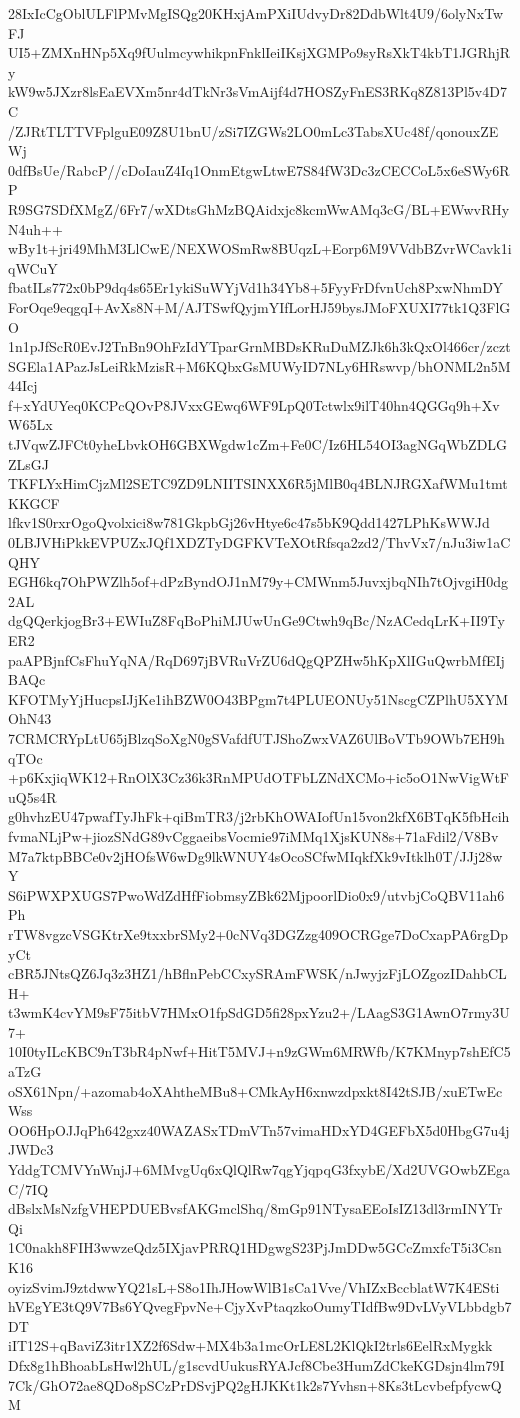 28IxIcCgOblULFlPMvMgISQg20KHxjAmPXiIUdvyDr82DdbWlt4U9/6olyNxTwFJ
UI5+ZMXnHNp5Xq9fUulmcywhikpnFnklIeiIKsjXGMPo9syRsXkT4kbT1JGRhjRy
kW9w5JXzr8lsEaEVXm5nr4dTkNr3sVmAijf4d7HOSZyFnES3RKq8Z813Pl5v4D7C
/ZJRtTLTTVFplguE09Z8U1bnU/zSi7IZGWs2LO0mLc3TabsXUc48f/qonouxZEWj
0dfBsUe/RabcP//cDoIauZ4Iq1OnmEtgwLtwE7S84fW3Dc3zCECCoL5x6eSWy6RP
R9SG7SDfXMgZ/6Fr7/wXDtsGhMzBQAidxjc8kcmWwAMq3cG/BL+EWwvRHyN4uh++
wBy1t+jri49MhM3LlCwE/NEXWOSmRw8BUqzL+Eorp6M9VVdbBZvrWCavk1iqWCuY
fbatILs772x0bP9dq4s65Er1ykiSuWYjVd1h34Yb8+5FyyFrDfvnUch8PxwNhmDY
ForOqe9eqgqI+AvXs8N+M/AJTSwfQyjmYIfLorHJ59bysJMoFXUXI77tk1Q3FlGO
1n1pJfScR0EvJ2TnBn9OhFzIdYTparGrnMBDsKRuDuMZJk6h3kQxOl466cr/zczt
SGEla1APazJsLeiRkMzisR+M6KQbxGsMUWyID7NLy6HRswvp/bhONML2n5M44Icj
f+xYdUYeq0KCPcQOvP8JVxxGEwq6WF9LpQ0Tctwlx9ilT40hn4QGGq9h+XvW65Lx
tJVqwZJFCt0yheLbvkOH6GBXWgdw1cZm+Fe0C/Iz6HL54OI3agNGqWbZDLGZLsGJ
TKFLYxHimCjzMl2SETC9ZD9LNIITSINXX6R5jMlB0q4BLNJRGXafWMu1tmtKKGCF
lfkv1S0rxrOgoQvolxici8w781GkpbGj26vHtye6c47s5bK9Qdd1427LPhKsWWJd
0LBJVHiPkkEVPUZxJQf1XDZTyDGFKVTeXOtRfsqa2zd2/ThvVx7/nJu3iw1aCQHY
EGH6kq7OhPWZlh5of+dPzByndOJ1nM79y+CMWnm5JuvxjbqNIh7tOjvgiH0dg2AL
dgQQerkjogBr3+EWIuZ8FqBoPhiMJUwUnGe9Ctwh9qBc/NzACedqLrK+II9TyER2
paAPBjnfCsFhuYqNA/RqD697jBVRuVrZU6dQgQPZHw5hKpXlIGuQwrbMfEIjBAQc
KFOTMyYjHucpsIJjKe1ihBZW0O43BPgm7t4PLUEONUy51NscgCZPlhU5XYMOhN43
7CRMCRYpLtU65jBlzqSoXgN0gSVafdfUTJShoZwxVAZ6UlBoVTb9OWb7EH9hqTOc
+p6KxjiqWK12+RnOlX3Cz36k3RnMPUdOTFbLZNdXCMo+ic5oO1NwVigWtFuQ5s4R
g0hvhzEU47pwafTyJhFk+qiBmTR3/j2rbKhOWAIofUn15von2kfX6BTqK5fbHcih
fvmaNLjPw+jiozSNdG89vCggaeibsVocmie97iMMq1XjsKUN8s+71aFdil2/V8Bv
M7a7ktpBBCe0v2jHOfsW6wDg9lkWNUY4sOcoSCfwMIqkfXk9vItklh0T/JJj28wY
S6iPWXPXUGS7PwoWdZdHfFiobmsyZBk62MjpoorlDio0x9/utvbjCoQBV11ah6Ph
rTW8vgzcVSGKtrXe9txxbrSMy2+0cNVq3DGZzg409OCRGge7DoCxapPA6rgDpyCt
cBR5JNtsQZ6Jq3z3HZ1/hBflnPebCCxySRAmFWSK/nJwyjzFjLOZgozIDahbCLH+
t3wmK4cvYM9sF75itbV7HMxO1fpSdGD5fi28pxYzu2+/LAagS3G1AwnO7rmy3U7+
10I0tyILcKBC9nT3bR4pNwf+HitT5MVJ+n9zGWm6MRWfb/K7KMnyp7shEfC5aTzG
oSX61Npn/+azomab4oXAhtheMBu8+CMkAyH6xnwzdpxkt8I42tSJB/xuETwEcWss
OO6HpOJJqPh642gxz40WAZASxTDmVTn57vimaHDxYD4GEFbX5d0HbgG7u4jJWDc3
YddgTCMVYnWnjJ+6MMvgUq6xQlQlRw7qgYjqpqG3fxybE/Xd2UVGOwbZEgaC/7IQ
dBslxMsNzfgVHEPDUEBvsfAKGmclShq/8mGp91NTysaEEoIsIZ13dl3rmINYTrQi
1C0nakh8FIH3wwzeQdz5IXjavPRRQ1HDgwgS23PjJmDDw5GCcZmxfcT5i3CsnK16
oyizSvimJ9ztdwwYQ21sL+S8o1IhJHowWlB1sCa1Vve/VhIZxBccblatW7K4ESti
hVEgYE3tQ9V7Bs6YQvegFpvNe+CjyXvPtaqzkoOumyTIdfBw9DvLVyVLbbdgb7DT
iIT12S+qBaviZ3itr1XZ2f6Sdw+MX4b3a1mcOrLE8L2KlQkI2trls6EelRxMygkk
Dfx8g1hBhoabLsHwl2hUL/g1scvdUukusRYAJcf8Cbe3HumZdCkeKGDsjn4lm79I
7Ck/GhO72ae8QDo8pSCzPrDSvjPQ2gHJKKt1k2s7Yvhsn+8Ks3tLcvbefpfycwQM

